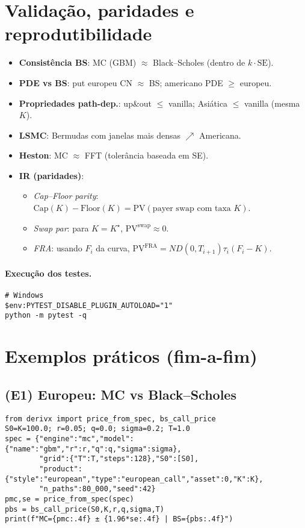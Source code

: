 \documentclass[11pt,a4paper]{article}
\begin{document}
\section{Validação, paridades e reprodutibilidade}
\begin{itemize}[leftmargin=1.2em]
\item \textbf{Consistência BS}: MC (GBM) $\approx$ Black--Scholes (dentro de $k\cdot\mathrm{SE}$).
\item \textbf{PDE vs BS}: put europeu CN $\approx$ BS; americano PDE $\ge$ europeu.
\item \textbf{Propriedades path-dep.}: up\&out $\le$ vanilla; Asiática $\le$ vanilla (mesma $K$).
\item \textbf{LSMC}: Bermudas com janelas mais densas $\nearrow$ Americana.
\item \textbf{Heston}: MC $\approx$ FFT (tolerância baseada em SE).
\item \textbf{IR (paridades)}:
  \begin{itemize}[nosep]
  \item \emph{Cap--Floor parity}: $\mathrm{Cap}(K)-\mathrm{Floor}(K)=\mathrm{PV}(\text{payer swap com taxa }K)$.
  \item \emph{Swap par}: para $K=K^\star$, $\mathrm{PV}^{\mathrm{swap}}\approx 0$.
  \item \emph{FRA}: usando $F_i$ da curva, $\mathrm{PV}^{\mathrm{FRA}} = N D(0,T_{i+1}) \tau_i (F_i-K)$.
  \end{itemize}
\end{itemize}

\paragraph{Execução dos testes.}
\begin{verbatim}
# Windows
$env:PYTEST_DISABLE_PLUGIN_AUTOLOAD="1"
python -m pytest -q
\end{verbatim}

\section{Exemplos práticos (fim-a-fim)}

\subsection{(E1) Europeu: MC vs Black--Scholes}
\begin{lstlisting}[style=pystyle]
from derivx import price_from_spec, bs_call_price
S0=K=100.0; r=0.05; q=0.0; sigma=0.2; T=1.0
spec = {"engine":"mc","model":{"name":"gbm","r":r,"q":q,"sigma":sigma},
        "grid":{"T":T,"steps":128},"S0":[S0],
        "product":{"style":"european","type":"european_call","asset":0,"K":K},
        "n_paths":80_000,"seed":42}
pmc,se = price_from_spec(spec)
pbs = bs_call_price(S0,K,r,q,sigma,T)
print(f"MC={pmc:.4f} ± {1.96*se:.4f} | BS={pbs:.4f}")
\end{lstlisting}
\end{document}
